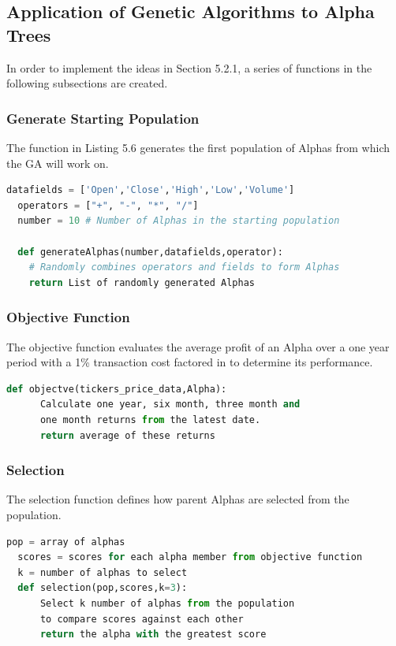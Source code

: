 \documentclass[a4paper,12pt]{report}
\numberwithin{equation}{section}
\theoremstyle{definition}
\begin{document}
\subsection{Application of Genetic Algorithms to Alpha Trees}
In order to implement the ideas in Section 5.2.1, a series of functions in the following subsections are created.
\subsubsection{Generate Starting Population}
The function in Listing 5.6 generates the first population of Alphas from which the GA will work on.

\begin{lstlisting}[language=Python, caption=Generate Starting Alphas Pseudocode, basicstyle=\footnotesize\ttfamily]
  datafields = ['Open','Close','High','Low','Volume'] 
  operators = ["+", "-", "*", "/"]
  number = 10 # Number of Alphas in the starting population
  
  def generateAlphas(number,datafields,operator):
    # Randomly combines operators and fields to form Alphas
    return List of randomly generated Alphas 
  \end{lstlisting}


\subsubsection{Objective Function}
The objective function evaluates the average profit of an Alpha over a one year period with a 1\% transaction cost factored in to determine its performance. 

\begin{lstlisting}[language=Python, caption=Objective Function Pseudocode, basicstyle=\footnotesize\ttfamily]
  def objectve(tickers_price_data,Alpha):
      Calculate one year, six month, three month and 
      one month returns from the latest date. 
      return average of these returns
  \end{lstlisting}

\subsubsection{Selection}
The selection function defines how parent Alphas are selected from the population. 
\begin{lstlisting}[language=Python, caption=Selection Function Pseudocode, basicstyle=\footnotesize\ttfamily]
  pop = array of alphas
  scores = scores for each alpha member from objective function
  k = number of alphas to select
  def selection(pop,scores,k=3):
      Select k number of alphas from the population 
      to compare scores against each other 
      return the alpha with the greatest score
\end{lstlisting}
\end{document}
